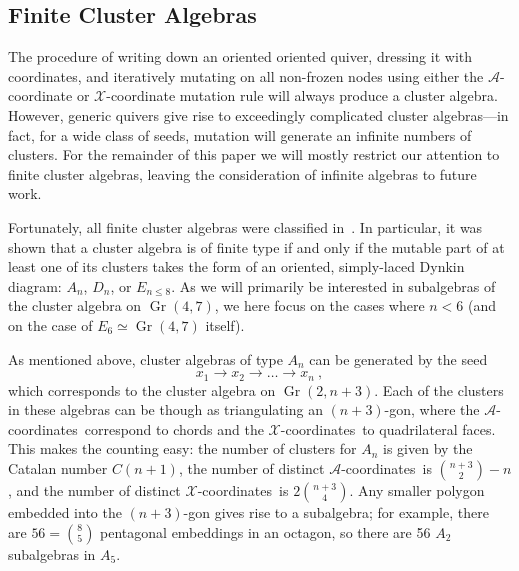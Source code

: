 \documentclass[12pt]{article}
\DeclareMathOperator{\Gr}{Gr}
\def\x{\mathcal{X}}
\def\xcoords{$\mathcal{X}$-coordinates}
\def\a{\mathcal{A}}
\def\acoords{$\mathcal{A}$-coordinates}
\begin{document}


\subsection{Finite Cluster Algebras}\label{sec:finite-algebras}

The procedure of writing down an oriented oriented quiver, dressing it with coordinates, and iteratively mutating on all non-frozen nodes using either the $\a$-coordinate or $\x$-coordinate mutation rule will always produce a cluster algebra. However, generic quivers give rise to exceedingly complicated cluster algebras---in fact, for a wide class of seeds, mutation will generate an infinite numbers of clusters. For the remainder of this paper we will mostly restrict our attention to finite cluster algebras, leaving the consideration of infinite algebras to future work. 


Fortunately, all finite cluster algebras were classified in~\cite{1054.17024}. In particular, it was shown that a cluster algebra is of finite type if and only if the mutable part of at least one of its clusters takes the form of an oriented, simply-laced Dynkin diagram: $A_n$, $D_n$, or $E_{n\le8}$.  As we will primarily be interested in subalgebras of the cluster algebra on $\Gr(4,7)$, we here focus on the cases where $n < 6$ (and on the case of $E_6 \simeq \Gr(4,7)$ itself). 

As mentioned above, cluster algebras of type $A_n$ can be generated by the seed
\begin{equation}\label{def:An}
  x_1\to x_2\to \ldots \to x_n \ ,
\end{equation}
which corresponds to the cluster algebra on $\Gr(2,n{+}3)$. Each of the clusters in these algebras can be though as triangulating an $(n+3)$-gon, where the \acoords\ correspond to chords and the \xcoords\ to quadrilateral faces. This makes the counting easy: the number of clusters for $A_n$ is given by the Catalan number $C(n+1)$, the number of distinct \acoords\ is $\binom{n+3}{2}-n$, and the number of distinct \xcoords\ is $2\binom{n+3}{4}$. Any smaller polygon embedded into the $(n+3)$-gon gives rise to a subalgebra; for example, there are $56=\binom{8}{5}$ pentagonal embeddings in an octagon, so there are 56 $A_2$ subalgebras in $A_5$. 
\end{document}
